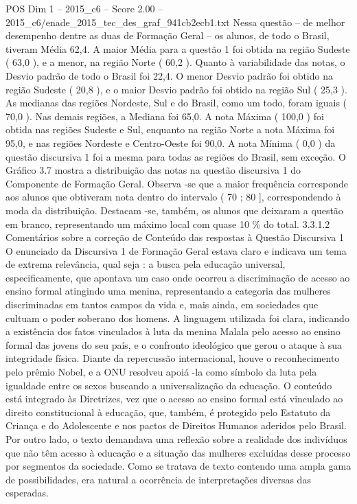 \begin{textsample}{POS Dim 1 – 2015\_c6 – Score 2.00 – 2015\_c6/enade\_2015\_tec\_des\_graf\_941cb2ecb1.txt}
Nessa questão – de melhor desempenho dentre as duas de Formação Geral – os alunos, de todo o Brasil, tiveram Média 62,4.
A maior Média para a questão 1 foi obtida na região Sudeste ( 63,0 ), e a menor, na região Norte ( 60,2 ).
Quanto à variabilidade das notas, o Desvio padrão de todo o Brasil foi 22,4.
O menor Desvio padrão foi obtido na região Sudeste ( 20,8 ), e o maior Desvio padrão foi obtido na região Sul ( 25,3 ).
As medianas das regiões Nordeste, Sul e do Brasil, como um todo, foram iguais ( 70,0 ).
Nas demais regiões, a Mediana foi 65,0.
A nota Máxima ( 100,0 ) foi obtida nas regiões Sudeste e Sul, enquanto na região Norte a nota Máxima foi 95,0, e nas regiões Nordeste e Centro-Oeste foi 90,0.
A nota Mínima ( 0,0 ) da questão discursiva 1 foi a mesma para todas as regiões do Brasil, sem exceção.
O Gráfico 3.7 mostra a distribuição das notas na questão discursiva 1 do Componente de Formação Geral.
Observa -se que a maior frequência corresponde aos alunos que obtiveram nota dentro do intervalo ( 70 ; 80 ], correspondendo à moda da distribuição.
Destacam -se, também, os alunos que deixaram a questão em branco, representando um máximo local com quase 10 \% do total. 3.3.1.2 Comentários sobre a correção de Conteúdo das respostas à Questão Discursiva 1 O enunciado da Discursiva 1 de Formação Geral estava claro e indicava um tema de extrema relevância, qual seja : a busca pela educação universal, especificamente, que apontava um caso onde ocorreu a discriminação de acesso ao ensino formal atingindo uma menina, representando a categoria das mulheres discriminadas em tantos campos da vida e, mais ainda, em sociedades que cultuam o poder soberano dos homens.
A linguagem utilizada foi clara, indicando a existência dos fatos vinculados à luta da menina Malala pelo acesso ao ensino formal das jovens do seu país, e o confronto ideológico que gerou o ataque à sua integridade física.
Diante da repercussão internacional, houve o reconhecimento pelo prêmio Nobel, e a ONU resolveu apoiá -la como símbolo da luta pela igualdade entre os sexos buscando a universalização da educação.
O conteúdo está integrado às Diretrizes, vez que o acesso ao ensino formal está vinculado ao direito constitucional à educação, que, também, é protegido pelo Estatuto da Criança e do Adolescente e nos pactos de Direitos Humanos aderidos pelo Brasil.
Por outro lado, o texto demandava uma reflexão sobre a realidade dos indivíduos que não têm acesso à educação e a situação das mulheres excluídas desse processo por segmentos da sociedade.
Como se tratava de texto contendo uma ampla gama de possibilidades, era natural a ocorrência de interpretações diversas das esperadas.

\end{textsample}
